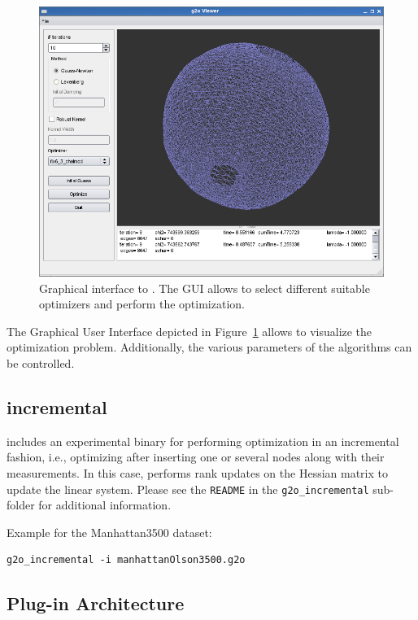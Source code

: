 \documentclass[a4paper]{article}
\begin{document}
\begin{figure}
  \centering
  \includegraphics[width=0.7\columnwidth]{pics/viewer.png}
  \caption{Graphical interface to \gopt. The GUI allows to select
  different suitable optimizers and perform the optimization.}
  \label{fig:viewer}
\end{figure}

The Graphical User Interface depicted in Figure~\ref{fig:viewer} allows
to visualize the optimization problem. Additionally, the various
parameters of the algorithms can be controlled.

\subsection{\gopt{} incremental}

\gopt{} includes an experimental binary for performing optimization in
an incremental fashion, i.e., optimizing after inserting one or several
nodes along with their measurements. In this case, \gopt{} performs
rank updates on the Hessian matrix to update the linear system. Please
see the \verb+README+ in the \verb+g2o_incremental+ sub-folder for
additional information.

Example for the Manhattan3500 dataset:
\begin{verbatim}
g2o_incremental -i manhattanOlson3500.g2o
\end{verbatim}

\subsection{Plug-in Architecture}
\end{document}
